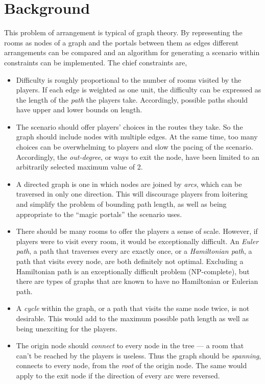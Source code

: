 \documentclass[landscape, a0, final]{a0poster}
\begin{document}
\begin{minipage}{0.20\linewidth}
\section{Background} 
This problem of arrangement is typical of graph theory.  By representing the rooms as nodes of a graph and the portals between them as edges different arrangements can be compared and an algorithm for generating a scenario within constraints can be implemented.  The chief constraints are, 
    \begin{itemize} 
        \item Difficulty is roughly proportional to the number of rooms visited by the players.  If each edge is weighted as one unit, the difficulty can be expressed as the length of the \emph{path} the players take.  Accordingly, possible paths should have upper and lower bounds on length.
        \item The scenario should offer players' choices in the routes they take.  So the graph should include nodes with multiple edges.  At the same time, too many choices can be overwhelming to players and slow the pacing of the scenario.  Accordingly, the \emph{out-degree}, or ways to exit the node, have been limited to an arbitrarily selected maximum value of 2.
        \item A directed graph is one in which nodes are joined by \emph{arcs}, which can be traversed in only one direction.  This will discourage players from loitering and simplify the problem of bounding path length, as well as being appropriate to the ``magic portals'' the scenario uses.
        \item There should be many rooms to offer the players a sense of scale.  However, if players were to visit every room, it would be exceptionally difficult.  An \emph{Euler path}, a path that traverses every arc exactly once, or a \emph{Hamiltonian path}, a path that visits every node, are both definitely not optimal.  Excluding a Hamiltonian path is an exceptionally difficult problem (NP-complete), but there are types of graphs that are known to have no Hamiltonian or Eulerian path.
        \item A \emph{cycle} within the graph, or a path that visits the same node twice, is not desirable.  This would add to the maximum possible path length as well as being unexciting for the players.
        \item The origin node should \emph{connect} to every node in the tree --- a room that can't be reached by the players is useless.  Thus the graph should be \emph{spanning}, connects to every node, from the \emph{root} of the origin node.  The same would apply to the exit node if the direction of every arc were reversed.
\end{itemize} 





\end{minipage} 
\end{document}

